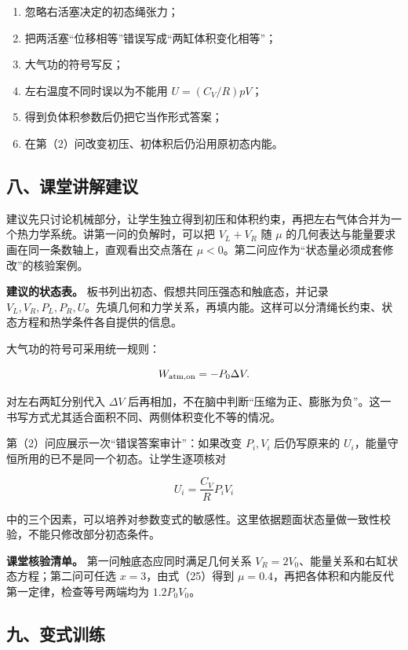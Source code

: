 \documentclass[12pt,a4paper,UTF8]{ctexart}
\newcommand{\tightlist}{\setlength{\itemsep}{0pt}\setlength{\parskip}{0pt}}
\begin{document}
\begin{enumerate}
\def\labelenumi{\arabic{enumi}.}
\tightlist
\item
  忽略右活塞决定的初态绳张力；
\item
  把两活塞``位移相等''错误写成``两缸体积变化相等''；
\item
  大气功的符号写反；
\item
  左右温度不同时误以为不能用 \(U=(C_V/R)pV\)；
\item
  得到负体积参数后仍把它当作形式答案；
\item
  在第（2）问改变初压、初体积后仍沿用原初态内能。
\end{enumerate}

\subsection{八、课堂讲解建议}\label{ux516bux8bfeux5802ux8bb2ux89e3ux5efaux8bae-2}

建议先只讨论机械部分，让学生独立得到初压和体积约束，再把左右气体合并为一个热力学系统。讲第一问的负解时，可以把
\(V_L+V_R\) 随 \(\mu\)
的几何表达与能量要求画在同一条数轴上，直观看出交点落在
\(\mu<0\)。第二问应作为``状态量必须成套修改''的核验案例。

\textbf{建议的状态表。} 板书列出初态、假想共同压强态和触底态，并记录
\(V_L,V_R,P_L,P_R,U\)。先填几何和力学关系，再填内能。这样可以分清绳长约束、状态方程和热学条件各自提供的信息。

大气功的符号可采用统一规则：

\[
W_{\rm atm,on}=-P_0\Delta V.
\]

对左右两缸分别代入 \(\Delta V\)
后再相加，不在脑中判断``压缩为正、膨胀为负''。这一书写方式尤其适合面积不同、两侧体积变化不等的情况。

第（2）问应展示一次``错误答案审计''：如果改变 \(P_i,V_i\) 后仍写原来的
\(U_i\)，能量守恒所用的已不是同一个初态。让学生逐项核对

\[
U_i=\frac{C_V}{R}P_iV_i
\]

中的三个因素，可以培养对参数变式的敏感性。这里依据题面状态量做一致性校验，不能只修改部分初态条件。

\textbf{课堂核验清单。} 第一问触底态应同时满足几何关系
\(V_R=2V_0\)、能量关系和右缸状态方程；第二问可任选
\(x=3\)，由式（25）得到
\(\mu=0.4\)，再把各体积和内能反代第一定律，检查等号两端均为
\(1.2P_0V_0\)。

\subsection{九、变式训练}\label{ux4e5dux53d8ux5f0fux8badux7ec3-2}
\end{document}

